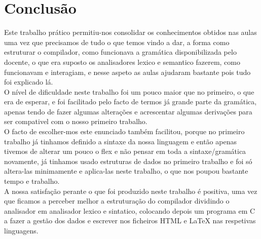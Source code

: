 \documentclass[11pt, a4paper]{report}
\begin{document}
\chapter{Conclusão}
Este trabalho prático permitiu-nos consolidar os conhecimentos obtidos nas aulas uma vez que precisamos de tudo o que temos vindo a dar, a forma como estruturar o compilador, como funcionava a gramática disponibilizada pelo docente, o que era suposto os analisadores lexico e semantico fazerem, como funcionavam e interagiam, e nesse aspeto as aulas ajudaram bastante pois tudo foi explicado lá.\\
O nível de dificuldade neste trabalho foi um pouco maior que no primeiro, o que era de esperar, e foi facilitado pelo facto de termos já grande parte da gramática, apenas tendo de fazer algumas alterações e acrescentar algumas derivações para ser compativel com o nosso primeiro trabalho.\\
O facto de escolher-mos este enunciado também facilitou, porque no primeiro trabalho já tinhamos definido a sintaxe da nossa linguagem e então apenas tivemos de alterar um pouco o flex e não pensar em toda a sintaxe/gramática novamente, já tinhamos usado estruturas de dados no primeiro trabalho e foi só altera-las minimamente e aplica-las neste trabalho, o que nos poupou bastante tempo e trabalho.\\
A nossa satisfação perante o que foi produzido neste trabalho é positiva, uma vez que ficamos a perceber melhor a estruturação do compilador dividindo o analisador em analisador lexico e sintatico, colocando depois um programa em C a fazer a gestão dos dados e escrever nos ficheiros HTML e LaTeX nas respetivas linguagens.\\
\end{document}
